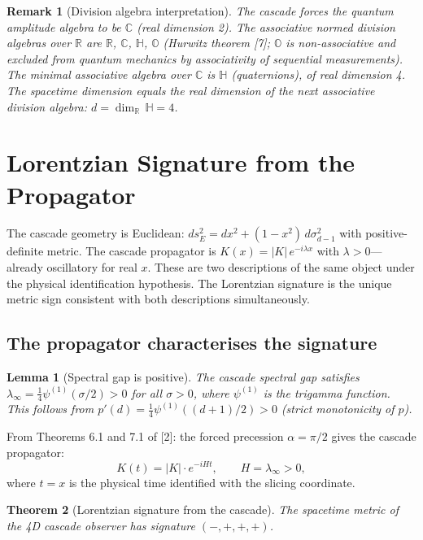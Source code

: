 \documentclass[12pt,a4paper]{article}
\newtheorem{theorem}{Theorem}[section]
\newtheorem{lemma}[theorem]{Lemma}
\newtheorem*{remark}{Remark}
\begin{document}
\begin{remark}[Division algebra interpretation]
The cascade forces the quantum amplitude
algebra to be $\mathbb{C}$ (real dimension 2). The associative normed division algebras over $\mathbb{R}$ are $\mathbb{R}$,
$\mathbb{C}$, $\mathbb{H}$, $\mathbb{O}$ (Hurwitz theorem [7]; $\mathbb{O}$ is non-associative and excluded from quantum mechanics
by associativity of sequential measurements). The minimal associative algebra over $\mathbb{C}$ is $\mathbb{H}$
(quaternions), of real dimension 4. The spacetime dimension equals the real dimension of
the next associative division algebra: $d = \dim_\mathbb{R}\,\mathbb{H} = 4$.
\end{remark}

\section{Lorentzian Signature from the Propagator}\label{sec:lorentzian-signature-from-the-propagator}

The cascade geometry is Euclidean: $ds^2_E = dx^2 + (1 - x^2)\,d\sigma_{d-1}^2$ with positive-definite
metric. The cascade propagator is $K(x) = |K|\,e^{-i\lambda x}$ with $\lambda > 0$---already oscillatory for
real $x$. These are two descriptions of the same object under the physical identification
hypothesis. The Lorentzian signature is the unique metric sign consistent with both
descriptions simultaneously.

\subsection{The propagator characterises the signature}

\begin{lemma}[Spectral gap is positive]\label{lem:spectral-gap}
The cascade spectral gap satisfies $\lambda_\infty =
\tfrac{1}{4}\psi^{(1)}(\sigma/2) > 0$ for all $\sigma > 0$, where $\psi^{(1)}$ is the trigamma function. This follows from $p'(d) =
\tfrac{1}{4}\psi^{(1)}((d + 1)/2) > 0$ (strict monotonicity of $p$).
\end{lemma}

From Theorems 6.1 and 7.1 of [2]: the forced precession $\alpha = \pi/2$ gives the cascade
propagator:
\[
K(t) = |K| \cdot e^{-iHt}, \qquad H = \lambda_\infty > 0,
\]
where $t = x$ is the physical time identified with the slicing coordinate.

\begin{theorem}[Lorentzian signature from the cascade]\label{thm:lorentzian}
The spacetime metric of the 4D cascade observer has signature $(-,+,+,+)$.
\end{theorem}
\end{document}
